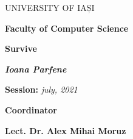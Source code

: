 \begin{center}
	\large{UNIVERSITY OF  IAȘI} \\
	\vspace{0.4cm}
	
	\large{\textbf{Faculty of Computer Science}} \\
    \vspace{4cm}
    
	\LARGE{\textbf{Survive}} \\
	\vspace{3cm}
	
	\large{\textbf{\textit{Ioana Parfene}}}\\
	\vspace{2.5cm}
	
	\large{\textbf{Session: }\textit{ july, 2021}}\\
	\vspace{2.5cm}
	
	\large{\textbf{Coordinator}}\\
	\vspace{0.4cm}
	
	\large{\textbf{Lect. Dr. Alex Mihai Moruz}}
\end{center}
\newpage